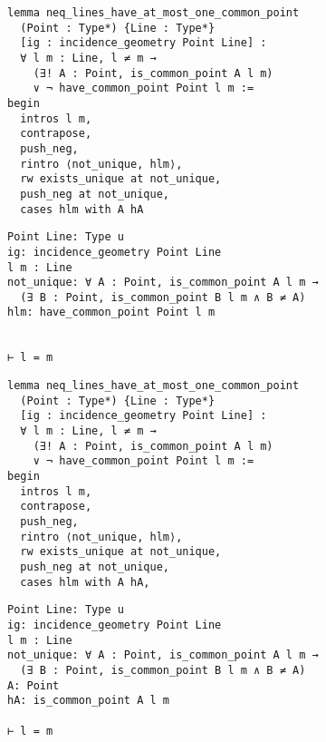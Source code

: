 \begin{frame}[fragile]
	\begin{multicols}{2}
		\begin{lstlisting}
lemma neq_lines_have_at_most_one_common_point 
  (Point : Type*) {Line : Type*} 
  [ig : incidence_geometry Point Line] :
  ∀ l m : Line, l ≠ m → 
    (∃! A : Point, is_common_point A l m) 
    ∨ ¬ have_common_point Point l m := 
begin
  intros l m,
  contrapose,
  push_neg,
  rintro ⟨not_unique, hlm⟩,
  rw exists_unique at not_unique,
  push_neg at not_unique,
  cases hlm with A hA
\end{lstlisting}
		\columnbreak
		\begin{lstlisting}
Point Line: Type u
ig: incidence_geometry Point Line
l m : Line
not_unique: ∀ A : Point, is_common_point A l m → 
  (∃ B : Point, is_common_point B l m ∧ B ≠ A)
hlm: have_common_point Point l m


⊢ l = m
		\end{lstlisting}
	\end{multicols}
\end{frame}










\begin{frame}[fragile]
	\begin{multicols}{2}
		\begin{lstlisting}
lemma neq_lines_have_at_most_one_common_point 
  (Point : Type*) {Line : Type*} 
  [ig : incidence_geometry Point Line] :
  ∀ l m : Line, l ≠ m → 
    (∃! A : Point, is_common_point A l m) 
    ∨ ¬ have_common_point Point l m := 
begin
  intros l m,
  contrapose,
  push_neg,
  rintro ⟨not_unique, hlm⟩,
  rw exists_unique at not_unique,
  push_neg at not_unique,
  cases hlm with A hA,
\end{lstlisting}
		\columnbreak
		\begin{lstlisting}
Point Line: Type u
ig: incidence_geometry Point Line
l m : Line
not_unique: ∀ A : Point, is_common_point A l m → 
  (∃ B : Point, is_common_point B l m ∧ B ≠ A)
A: Point
hA: is_common_point A l m

⊢ l = m
		\end{lstlisting}
	\end{multicols}
\end{frame}










